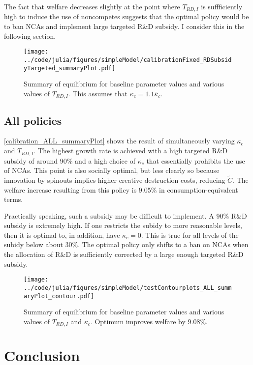 \documentclass[11pt,english]{article}
\begin{document}
The fact that welfare decreases slightly at the point where $T_{RD,I}$ is suffficiently high to induce the use of noncompetes suggests that the optimal policy would be to ban NCAs and implement large targeted R\&D subsidy. I consider this in the following section.

\begin{figure}[]
	\texttt{[image: ../code/julia/figures/simpleModel/calibrationFixed\_RDSubsidyTargeted\_summaryPlot.pdf]}
	\caption{Summary of equilibrium for baseline parameter values and various values of $T_{RD,I}$. This assumes that $\kappa_c = 1.1 \bar{\kappa}_c$.}
	\label{calibration_RDSubsidyTargeted_summaryPlot}
\end{figure}


\subsection{All policies}

\autoref{calibration_ALL_summaryPlot} shows the result of simultaneously varying $\kappa_c$ and $T_{RD,I}$. The highest growth rate is achieved with a high targeted R\&D subsidy of around 90\% and a high choice of $\kappa_c$ that essentially prohibits the use of NCAs. This point is also socially optimal, but less clearly so because innovation by spinouts implies higher creative destruction costs, reducing $\tilde{C}$. The welfare increase resulting from this policy is 9.05\% in consumption-equivalent terms.

Practically speaking, such a subsidy may be difficult to implement. A 90\% R\&D subsidy is extremely high. If one restricts the subidy to more reasonable levels, then it is optimal to, in addition, have $\kappa_c = 0$. This is true for all levels of the subidy below about 30\%. The optimal policy only shifts to a ban on NCAs when the allocation of R\&D is sufficiently corrected by a large enough targeted R\&D subsidy. 

\begin{figure}[]
	\centering
	\texttt{[image: ../code/julia/figures/simpleModel/testContourplots\_ALL\_summaryPlot\_contour.pdf]}
	\caption{Summary of equilibrium for baseline parameter values and various values of $T_{RD,I}$ and $\kappa_c$. Optimum improves welfare by 9.08\%.}
	\label{calibration_ALL_summaryPlot}
\end{figure}

\section{Conclusion}
 
\end{document}
